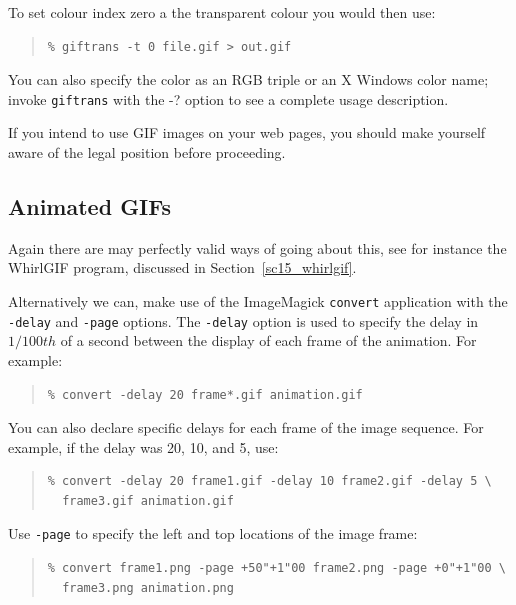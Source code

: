 \documentclass[twoside,11pt]{article}
\newcommand{\htmlref}[2]{#1}
\newcommand{\latex}[1]{#1}
\newcommand{\xlabel}[1]{}
\begin{document}
To set colour index zero a the transparent colour you would then use:

\small
\begin{quote}
\begin{verbatim}
% giftrans -t 0 file.gif > out.gif
\end{verbatim}
\end{quote}
\normalsize

You can also specify the color as an RGB triple or an X Windows color
name; invoke {\tt giftrans} with the -? option to see a complete usage
description.

If you intend to use GIF images on your web pages, you should make
yourself aware of the \htmlref{legal position}{sc15_giflegal} before
proceeding.

\subsection{\xlabel{sc15_animated}Animated GIFs\label{sc15_animated}}

Again there are may perfectly valid ways of going about this, see for
instance the \htmlref{WhirlGIF}{sc15_whirlgif} program\latex{,
discussed in Section~\ref{sc15_whirlgif}}.

Alternatively we can, make use of the
\htmlref{ImageMagick}{sc15_magick} {\tt convert} application with the
{\tt -delay} and {\tt -page} options. The {\tt -delay} option is used
to specify the delay in $1/100 th$ of a second between the display of
each frame of the animation. For example:

\small
\begin{quote}
\begin{verbatim}
% convert -delay 20 frame*.gif animation.gif
\end{verbatim}
\end{quote}
\normalsize

You can also declare specific delays for each frame of the image
sequence. For example, if the delay was 20, 10, and 5, use:

\small
\begin{quote}
\begin{verbatim}
% convert -delay 20 frame1.gif -delay 10 frame2.gif -delay 5 \
  frame3.gif animation.gif
\end{verbatim}
\end{quote}
\normalsize

Use {\tt -page} to specify the left and top locations of the image frame:

\small
\begin{quote}
\begin{verbatim}
% convert frame1.png -page +50"+1"00 frame2.png -page +0"+1"00 \
  frame3.png animation.png
\end{verbatim}
\end{quote}
\normalsize
\end{document}
